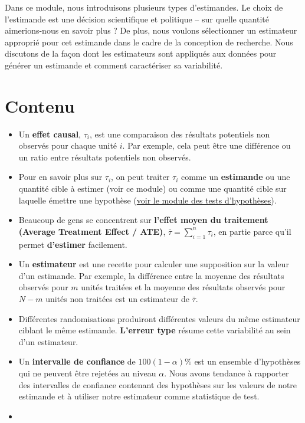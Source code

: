\documentclass[
  12pt,
]{book}
\begin{document}
Dans ce module, nous introduisons plusieurs types d'estimandes. Le choix de l'estimande est une décision scientifique et politique -- sur quelle quantité aimerions-nous en savoir plus ? De plus, nous voulons sélectionner un estimateur approprié pour cet estimande dans le cadre de la conception de recherche. Nous discutons de la façon dont les estimateurs sont appliqués aux données pour générer un estimande et comment caractériser sa variabilité.

\hypertarget{contenu-4}{%
\section{Contenu}\label{contenu-4}}

\begin{itemize}
\item
  Un \textbf{effet causal}, \(\tau_i\), est une comparaison des résultats potentiels non observés pour chaque unité \(i\). Par exemple, cela peut être une différence ou un ratio entre résultats potentiels non observés.
\item
  Pour en savoir plus sur \(\tau_{i}\), on peut traiter \(\tau_{i}\) comme un \textbf{estimande} ou une quantité cible à estimer (voir ce module)
  ou comme une quantité cible sur laquelle émettre une hypothèse (\href{hypothesis-testing.html}{voir le module des tests d'hypothèses}).
\item
  Beaucoup de gens se concentrent sur \textbf{l'effet moyen du traitement (Average Treatment Effect / ATE)}, \(\bar{\tau}=\sum_{i=1}^n  \tau_{i}\), en partie parce qu'il permet \textbf{d'estimer} facilement.
\item
  Un \textbf{estimateur} est une recette pour calculer une supposition sur la valeur d'un estimande. Par exemple, la différence entre la moyenne des résultats observés pour \(m\) unités traitées et la moyenne des résultats observés pour \(N-m\) unités non traitées est un estimateur de \(\bar{\tau}\).
\item
  Différentes randomisations produiront différentes valeurs du même estimateur ciblant le même estimande. \textbf{L'erreur type} résume cette variabilité au sein d'un estimateur.
\item
  Un \textbf{intervalle de confiance} de \(100(1-\alpha)\)\% est un ensemble d'hypothèses qui ne peuvent être rejetées au niveau \(\alpha\). Nous avons tendance à rapporter des intervalles de confiance contenant des hypothèses sur les valeurs de notre estimande et à utiliser notre estimateur comme statistique de test.
\item

\end{itemize}
\end{document}
